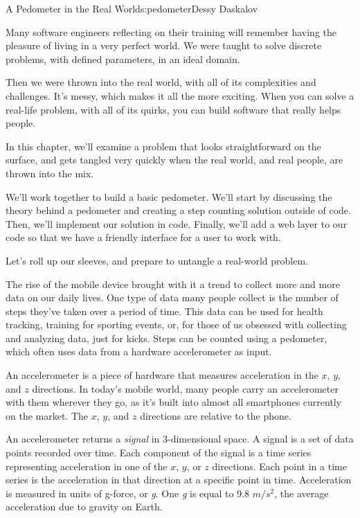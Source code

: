 \begin{aosachapter}{A Pedometer in the Real World}{s:pedometer}{Dessy Daskalov}

\label{a-perfect-world}

Many software engineers reflecting on their training will remember
having the pleasure of living in a very perfect world. We were taught to
solve discrete problems, with defined parameters, in an ideal domain.

Then we were thrown into the real world, with all of its complexities
and challenges. It's messy, which makes it all the more exciting. When
you can solve a real-life problem, with all of its quirks, you can build
software that really helps people.

In this chapter, we'll examine a problem that looks straightforward on
the surface, and gets tangled very quickly when the real world, and real
people, are thrown into the mix.

We'll work together to build a basic pedometer. We'll start by
discussing the theory behind a pedometer and creating a step counting
solution outside of code. Then, we'll implement our solution in code.
Finally, we'll add a web layer to our code so that we have a friendly
interface for a user to work with.

Let's roll up our sleeves, and prepare to untangle a real-world problem.

\label{pedometer-theory}

The rise of the mobile device brought with it a trend to collect more
and more data on our daily lives. One type of data many people collect
is the number of steps they've taken over a period of time. This data
can be used for health tracking, training for sporting events, or, for
those of us obsessed with collecting and analyzing data, just for kicks.
Steps can be counted using a pedometer, which often uses data from a
hardware accelerometer as input.

\label{whats-an-accelerometer}

An accelerometer is a piece of hardware that measures acceleration in
the $x$, $y$, and $z$ directions. In today's mobile world, many people
carry an accelerometer with them wherever they go, as it's built into
almost all smartphones currently on the market. The $x$, $y$, and $z$
directions are relative to the phone.

An accelerometer returns a \emph{signal} in 3-dimensional space. A
signal is a set of data points recorded over time. Each component of the
signal is a time series representing acceleration in one of the $x$,
$y$, or $z$ directions. Each point in a time series is the acceleration
in that direction at a specific point in time. Acceleration is measured
in units of g-force, or \emph{g}. One \emph{g} is equal to 9.8 $m/s^2$,
the average acceleration due to gravity on Earth.


\end{aosachapter}
